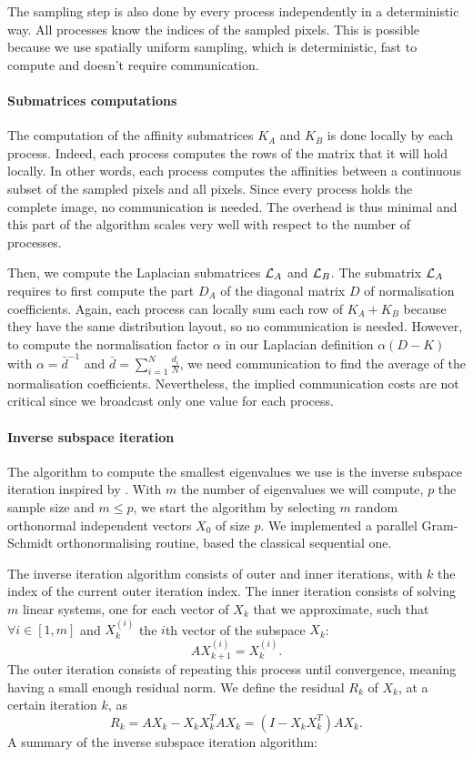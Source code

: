 The sampling step is also done by every process independently in a deterministic way.
All processes know the indices of the sampled pixels.
This is possible because we use spatially uniform sampling, which is deterministic, fast to compute and doesn't require communication.

\paragraph{Submatrices computations}
The computation of the affinity submatrices \(K_A\) and \(K_B\) is done locally by each process.
Indeed, each process computes the rows of the matrix that it will hold locally.
In other words, each process computes the affinities between a continuous subset of the sampled pixels and all pixels.
Since every process holds the complete image, no communication is needed.
The overhead is thus minimal and this part of the algorithm scales very well with respect to the number of processes.

Then, we compute the Laplacian submatrices \(\operatorname{\mathcal{L}}_A\) and \(\operatorname{\mathcal{L}}_B\).
The submatrix \(\operatorname{\mathcal{L}}_A\) requires to first compute the part \(D_A\) of the diagonal matrix \(D\) of normalisation coefficients.
Again, each process can locally sum each row of \(K_A + K_B\) because they have the same distribution layout, so no communication is needed.
However, to compute the normalisation factor \(\alpha\) in our Laplacian definition \(\alpha (D - K)\) with \(\alpha = \bar{d}^{-1}\) and \(\bar{d} = \sum^N_{i=1} \frac{d_i}{N}\), we need communication to find the average of the normalisation coefficients.
Nevertheless, the implied communication costs are not critical since we broadcast only one value for each process.

\paragraph{Inverse subspace iteration}
The algorithm to compute the smallest eigenvalues we use is the inverse subspace iteration inspired by \cite{el_khoury_acceleration_2014}.
With \(m\) the number of eigenvalues we will compute, \(p\) the sample size and \(m \le p\), we start the algorithm by selecting \(m\) random orthonormal independent vectors \(X_0\) of size \(p\).
We implemented a parallel Gram-Schmidt orthonormalising routine, based the classical sequential one.

The inverse iteration algorithm consists of outer and inner iterations, with \(k\) the index of the current outer iteration index.
The inner iteration consists of solving \(m\) linear systems, one for each vector of \(X_k\) that we approximate, such that \(\forall i \in [1, m]\) and \(X_k^{(i)}\) the \(i\)th vector of the subspace \(X_k\):
\[A X_{k+1}^{(i)} = X_k^{(i)}.\]
The outer iteration consists of repeating this process until convergence, meaning having a small enough residual norm.
We define the residual \(R_k\) of \(X_k\), at a certain iteration \(k\), as
\[R_k = A X_k - X_k X_k^T A X_k = (I - X_k X_k^T) A X_k.\]
A summary of the inverse subspace iteration algorithm:


